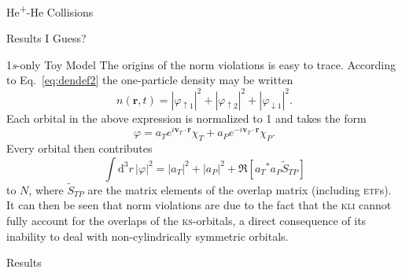\documentclass[letterpaper, 11 pt]{report}
\begin{document}
\begin{chapter}{\texorpdfstring{He\textsuperscript{+}}{He+}-He Collisions \label{chap:hephe}}
\begin{section}{Results I Guess? \label{sec:hephe-disc}}
\begin{subsection}{1\textit{s}-only Toy Model \label{sec:toy}}
         The origins of the norm violations is easy to trace. According to Eq.~\eqref{eq:dendef2} the
         one-particle density may be written
         \begin{equation} \label{eq:toyden}
            n(\mathbf{r},t) = \left| \varphi_{\uparrow 1}\right|^2
                            + \left| \varphi_{\uparrow 2}\right|^2
                            + \left| \varphi_{\downarrow 1}\right|^2.
         \end{equation}
         Each orbital in the above expression is normalized to 1 and takes the form
         \begin{equation}
            \varphi = a_T e^{i \mathbf{v}_T \cdot \mathbf{r}} \chi_T
                    + a_P e^{-i \mathbf{v}_T \cdot \mathbf{r}} \chi_P.
         \end{equation}
         Every orbital then contributes
         \begin{equation}
            \int \mathrm{d}^3 r \, \left| \varphi \right|^2 = \left| a_T \right|^2 
                                                            + \left| a_P \right|^2
            + \Re \left[ {a_T}^* a_P \tilde{S}_{TP} \right]
         \end{equation}
         to $N$, where $\tilde{S}_{TP}$ are the matrix elements of the overlap matrix (including
         \textsc{etf}s). It can then be seen that norm violations are due to the fact that
         the \textsc{kli} cannot fully account for the overlaps of the \textsc{ks}-orbitals, a direct
         consequence of its inability to deal with non-cylindrically symmetric orbitals.

      \end{subsection}

      \begin{subsection}{Results \label{sec:hephe-res}}


\end{subsection}
\end{section}
\end{chapter}
\end{document}
